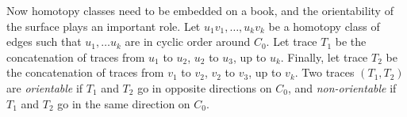 





Now homotopy classes need to be embedded on a book, and the orientability of the surface plays an important role. Let \(u_1 v_1, \ldots, u_k v_k\) be a homotopy class of edges such that $u_1, \ldots u_k$ are in cyclic order around $C_0$. Let trace \(T_1\) be the concatenation of traces from \(u_1\) to \(u_2\), $u_2$ to $u_3$, up to $u_k$. Finally, let trace \(T_2\) be the concatenation of traces from \(v_1\) to \(v_2\), $v_2$ to $v_3$, up to $v_k$.
Two traces $(T_1, T_2)$ are \textit{orientable} if \(T_1\) and \(T_2\) go in opposite directions on $C_0$, and \textit{non-orientable} if \(T_1\) and \(T_2\) go in the same direction on $C_0$.

